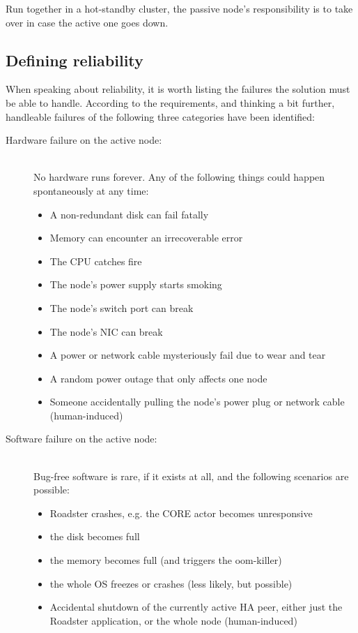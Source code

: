 Run together in a hot-standby cluster, the passive node's responsibility is to
take over in case the active one goes down.


\subsection{Defining reliability}
When speaking about reliability, it is worth listing the failures the solution must be
able to handle. According to the requirements, and thinking a bit further,
handleable failures of the following three categories have been identified:

\begin{description}
	\item [Hardware failure on the active node:] \hfill\\
		No hardware runs forever. Any of the following things could
		happen spontaneously at any time:

		\begin{itemize}
			\item A non-redundant disk can fail fatally
			\item Memory can encounter an irrecoverable error
			\item The \gls{CPU} catches fire
			\item The node's power supply starts smoking
			\item The node's switch port can break
			\item The node's \gls{NIC} can break
			\item A power or network cable mysteriously fail due to wear and tear
			\item A random power outage that only affects one node
			\item Someone accidentally pulling the node's power
				plug or network cable (human-induced)
		\end{itemize}

	\item [Software failure on the active node:] \hfill\\
		Bug-free software is rare, if it exists at all, and the
		following scenarios are possible:

		\begin{itemize}
			\item Roadster crashes, e.g. the CORE actor becomes unresponsive
			\item the disk becomes full
			\item the memory becomes full (and triggers the \gls{oom-killer})
			\item the whole OS freezes or crashes (less likely, but possible)
			\item Accidental shutdown of the currently active HA
				peer, either just the Roadster application, or
				the whole node (human-induced)
		\end{itemize}


\end{description}
